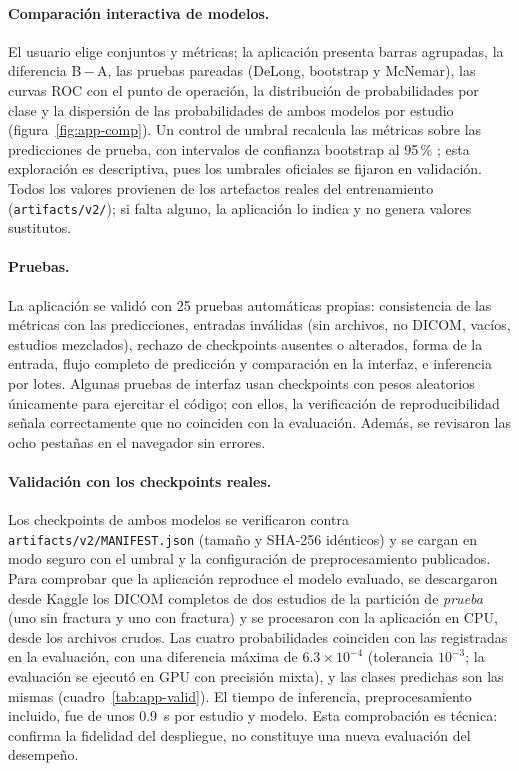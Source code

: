 \paragraph{Comparaci\'on interactiva de modelos.} El usuario elige conjuntos y m\'etricas; la aplicaci\'on presenta barras agrupadas, la diferencia B\,$-$\,A, las pruebas pareadas (DeLong, bootstrap y McNemar), las curvas ROC con el punto de operaci\'on, la distribuci\'on de probabilidades por clase y la dispersi\'on de las probabilidades de ambos modelos por estudio (figura~\ref{fig:app-comp}). Un control de umbral recalcula las m\'etricas sobre las predicciones de prueba, con intervalos de confianza bootstrap al 95\,\% \citep{efron1993bootstrap}; esta exploraci\'on es descriptiva, pues los umbrales oficiales se fijaron en validaci\'on. Todos los valores provienen de los artefactos reales del entrenamiento (\texttt{artifacts/v2/}); si falta alguno, la aplicaci\'on lo indica y no genera valores sustitutos.

\paragraph{Pruebas.} La aplicaci\'on se valid\'o con 25 pruebas autom\'aticas propias: consistencia de las m\'etricas con las predicciones, entradas inv\'alidas (sin archivos, no DICOM, vac\'ios, estudios mezclados), rechazo de checkpoints ausentes o alterados, forma de la entrada, flujo completo de predicci\'on y comparaci\'on en la interfaz, e inferencia por lotes. Algunas pruebas de interfaz usan checkpoints con pesos aleatorios \'unicamente para ejercitar el c\'odigo; con ellos, la verificaci\'on de reproducibilidad se\~nala correctamente que no coinciden con la evaluaci\'on. Adem\'as, se revisaron las ocho pesta\~nas en el navegador sin errores.

\paragraph{Validaci\'on con los checkpoints reales.} Los checkpoints de ambos modelos se verificaron contra \texttt{artifacts/v2/MANIFEST.json} (tama\~no y SHA-256 id\'enticos) y se cargan en modo seguro con el umbral y la configuraci\'on de preprocesamiento publicados. Para comprobar que la aplicaci\'on reproduce el modelo evaluado, se descargaron desde Kaggle los DICOM completos de dos estudios de la partici\'on de \emph{prueba} (uno sin fractura y uno con fractura) y se procesaron con la aplicaci\'on en CPU, desde los archivos crudos. Las cuatro probabilidades coinciden con las registradas en la evaluaci\'on, con una diferencia m\'axima de $6.3\times10^{-4}$ (tolerancia $10^{-3}$; la evaluaci\'on se ejecut\'o en GPU con precisi\'on mixta), y las clases predichas son las mismas (cuadro~\ref{tab:app-valid}). El tiempo de inferencia, preprocesamiento incluido, fue de unos 0.9~s por estudio y modelo. Esta comprobaci\'on es t\'ecnica: confirma la fidelidad del despliegue, no constituye una nueva evaluaci\'on del desempe\~no.

